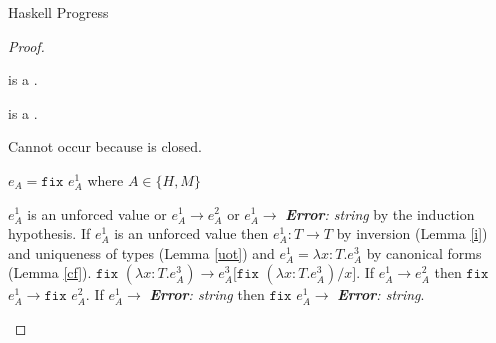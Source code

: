 \begin{theorem}{Haskell Progress}
\begin{proof}
\begin{case}

\psnils

\psnils is a \profv.

\end{case}


\newcommand{\psconsh}{\expcons{\first{\varexph}}{\second{\varexph}}\xspace}

\begin{case}

\psconsh

\psconsh is a \profv.

\end{case}


\newcommand{\psvar}{\varvarh\xspace}

\begin{case}

\psvar

Cannot occur because \varexph is closed.

\end{case}


\newcommand{\psfapp}{\expfapp{\first{\varexph}}{\second{\varexph}}\xspace}
\newcommand{\x}{\expfabss{\varvarh}{\first{\vartyh}}{\third{\varexph}}\xspace}

\begin{case}

\psfapp

\pshypref
{\first{\varexph}}
{\third{\varexph}}
\psval
{\first{\varexph}}
{\tyfun{\first{\vartyh}}{\second{\vartyh}}}
{\x}
\psred
{\expfapp{(\x)}{\second{\varexph}}}
{\expsubst{\third{\varexph}}{\second{\varexph}}{\varvarh}}
\pssub
{\first{\varexph}}
{\third{\varexph}}
{\psfapp}
{\expfapp{\third{\varexph}}{\second{\varexph}}}
\pserr
{\first{\varexph}}
{\psfapp}

\end{case}


\begin{case}

$e_{A}=\mathtt{fix}$ $e_{A}^{1}$ where $A\in\lbrace H,M\rbrace$

$e_{A}^{1}$ is an unforced value or $e_{A}^{1}\rightarrow e_{A}^{2}$ or $e_{A}^{1}\rightarrow$ \emph{\textbf{Error}: string} by the induction hypothesis.  If $e_{A}^{1}$ is an unforced value then $e_{A}^{1}:T\rightarrow T$ by inversion (Lemma \ref{i}) and uniqueness of types (Lemma \ref{uot}) and $e_{A}^{1}=\lambda x:T.e_{A}^{3}$ by canonical forms (Lemma \ref{cf}).  $\mathtt{fix}$ $(\lambda x:T.e_{A}^{3})\rightarrow e_{A}^{3}[\mathtt{fix}$ $(\lambda x:T.e_{A}^{3})/x]$.  If $e_{A}^{1}\rightarrow e_{A}^{2}$ then $\mathtt{fix}$ $e_{A}^{1}\rightarrow\mathtt{fix}$ $e_{A}^{2}$.  If $e_{A}^{1}\rightarrow$ \emph{\textbf{Error}: string} then $\mathtt{fix}$ $e_{A}^{1}\rightarrow$ \emph{\textbf{Error}: string}.


\end{case}
\end{proof}
\end{theorem}
